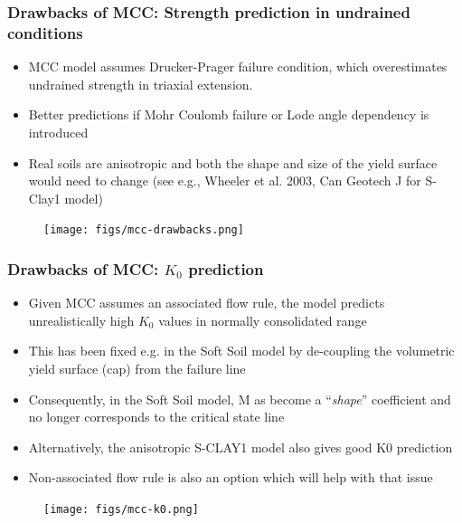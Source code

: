 \documentclass[notes]{beamer}
\begin{document}
\begin{frame}
\frametitle{Drawbacks of MCC: Strength prediction in undrained conditions}
\noindent
\fboxsep=0pt
\noindent
\begin{minipage}[t]{0.65\linewidth}
	\begin{itemize}
		\item MCC model assumes Drucker-Prager failure
		condition, which overestimates undrained strength in triaxial extension. 
		\item Better predictions if Mohr Coulomb failure or Lode angle dependency is introduced
		\item Real soils are anisotropic and both the shape and size of the yield surface would need to change (see e.g., Wheeler et al. 2003, Can Geotech J for S-Clay1 model)
	\end{itemize}
	
\end{minipage}%
\hfill
\begin{minipage}[t]{0.35\linewidth}
	\begin{figure}
		\texttt{[image: figs/mcc-drawbacks.png]}
	\end{figure}
\end{minipage}	
\end{frame}

\begin{frame}
\frametitle{Drawbacks of MCC: $K_0$ prediction}
\noindent
\fboxsep=0pt
\noindent
\begin{minipage}[t]{0.65\linewidth}
	\begin{itemize}
		\item Given MCC assumes an associated flow
		rule, the model predicts unrealistically high
		$K_0$ values in normally consolidated range
		\item This has been fixed e.g. in the Soft Soil
		model by de-coupling the volumetric yield
		surface (cap) from the failure line
		\item Consequently, in the Soft Soil model, M
		as become a ``\textit{shape}'' coefficient and no 	longer corresponds to the critical state
		line
		\item Alternatively, the anisotropic S-CLAY1
		model also gives good K0 prediction
		\item Non-associated flow rule is also an option which will help with that issue
	\end{itemize}
	
\end{minipage}%
\hfill
\begin{minipage}[t]{0.35\linewidth}
	\begin{figure}
		\texttt{[image: figs/mcc-k0.png]}
	\end{figure}
\end{minipage}	
\end{frame}
\end{document}
